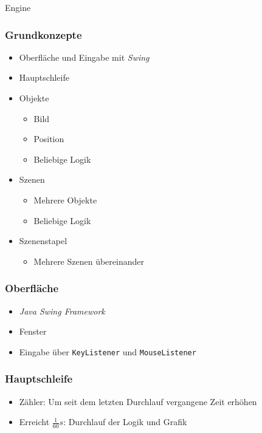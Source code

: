 \begin{frame}
	\begin{center}
		\Huge Engine
	\end{center}
\end{frame}


\begin{frame}
	\frametitle{Grundkonzepte}
	\begin{itemize}
		\item Oberfläche und Eingabe mit \textit{Swing}
		\item Hauptschleife
		\item Objekte
		\begin{itemize}
			\item Bild
			\item Position
			\item Beliebige Logik
		\end{itemize}
		\item Szenen
		\begin{itemize}
			\item Mehrere Objekte
			\item Beliebige Logik
		\end{itemize}
		\item Szenenstapel
		\begin{itemize}
			\item Mehrere Szenen übereinander
		\end{itemize}
	\end{itemize}
\end{frame}

\begin{frame}
	\frametitle{Oberfläche}
	\begin{itemize}
		\item \textit{Java Swing Framework}
		\item Fenster
		\item Eingabe über \texttt{KeyListener} und \texttt{MouseListener}
	\end{itemize}
\end{frame}

\begin{frame}
	\frametitle{Hauptschleife}
	\begin{itemize}
		\item Zähler: Um seit dem letzten Durchlauf vergangene Zeit erhöhen
		\item Erreicht $\frac{1}{60}s$: Durchlauf der Logik und Grafik
	\end{itemize}
\end{frame}

